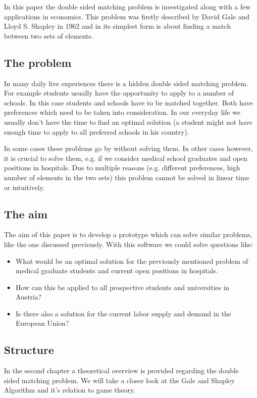 In this paper the double sided matching problem is investigated along with a few applications in economics.
This problem was firstly described by David Gale and Lloyd S. Shapley in 1962 \cite{gale62a} and in its simplest form is about finding a match between two sets of elements.

\subsection{The problem}
In many daily live experiences there is a hidden double sided matching problem. 
For example students usually have the opportunity to apply to a number of schools. 
In this case students and schools have to be matched together. 
Both have preferences which need to be taken into consideration. 
In our everyday life we usually don't have the time to find an optimal solution (a student might not have enough time to apply to all preferred schools in his country). 

In some cases these problems go by without solving them. 
In other cases however, it is crucial to solve them, e.g. if we consider medical school graduates and open positions in hospitals. 
Due to multiple reasons (e.g. different preferences, high number of elements in the two sets) this problem cannot be solved in linear time or intuitively.

\subsection{The aim}
The aim of this paper is to develop a prototype which can solve similar problems, like the one discussed previously.
With this software we could solve questions like:
\begin{itemize}
			\item What would be an optimal solution for the previously mentioned problem of medical graduate students and current open positions in hospitals.
			\item How can this be applied to all prospective students and universities in Austria?
			\item Is there also a solution for the current labor supply and demand in the European Union?
			\end{itemize}

\subsection{Structure}
In the second chapter a theoretical overview is provided regarding the double sided matching problem.
We will take a closer look at the Gale and Shapley Algorithm and it's relation to game theory.

